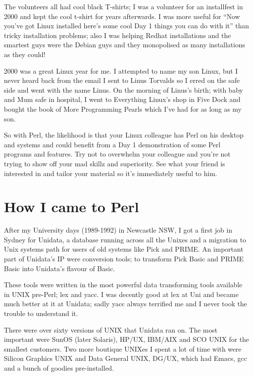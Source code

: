 \documentclass{article}      %
\begin{document}
The volunteers all had cool black T-shirts; I was a volunteer for an
installfest in 2000 and kept the cool t-shirt for years afterwards.
I was more useful for ``Now you've got Linux installed here's some
cool Day 1 things you can do with it'' than tricky installation
problems; also I was helping Redhat installations and the smartest
guys were the Debian guys and they monopolised as many installations
as they could!

2000 was a great Linux year for me. I attempted to name my son Linux,
but I never heard back from the email I sent to Linus Torvalds so I
erred on the safe side and went with the name Linus. On the morning of
Linus's birth; with baby and Mum safe in hospital, I went to
Everything Linux's shop in Five Dock and bought the book of
More Programming Pearls which I've had for as long as my son.

So with Perl, the likelihood is that your Linux colleague has Perl on
his desktop and systems and could benefit from a Day 1 demonstration
of some Perl programs and features. Try not to overwhelm your
colleague and you're not trying to show off your mad skillz and
superiority. See what your friend is interested in and tailor your
material so it's immediately useful to him.

\section{How I came to Perl}

After my University days (1989-1992) in Newcastle NSW, I got a first
job in Sydney for Unidata, a database running across all the Unixes
and a migration to Unix systems path for users of old systems like
Pick and PRIME. An important part of Unidata's IP were conversion
tools; to transform Pick Basic and PRIME Basic into Unidata's flavour
of Basic.

These tools were written in the most powerful data transforming tools
available in UNIX pre-Perl; lex and yacc. I was decently good at lex
at Uni and became much better at it at Unidata; sadly yacc always
terrified me and I never took the trouble to understand it.

There were over sixty versions of UNIX that Unidata ran on. The most
important were SunOS (later Solaris), HP/UX, IBM/AIX and SCO UNIX for
the smallest customers. Two more boutique UNIXes I spent a lot of time
with were Silicon Graphics UNIX and Data General UNIX, DG/UX, which
had Emacs, gcc and a bunch of goodies pre-installed.
\end{document}
